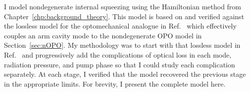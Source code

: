 I model nondegenerate internal squeezing using the Hamiltonian method from Chapter~\ref{chp:background_theory}. %
This model is based on and verified against the lossless model for the optomechanical analogue in Ref.~\cite{Li2020} which effectively couples an arm cavity mode to the nondegenerate OPO model in Section~\ref{sec:nOPO}. %
My methodology was to start with that lossless model in Ref.~\cite{Li2020} and progressively add the complications of optical loss in each mode, radiation pressure, and pump phase so that I could study each complication separately. At each stage, I verified that the model recovered the previous stage in the appropriate limits.  For brevity, I present the complete model here.

